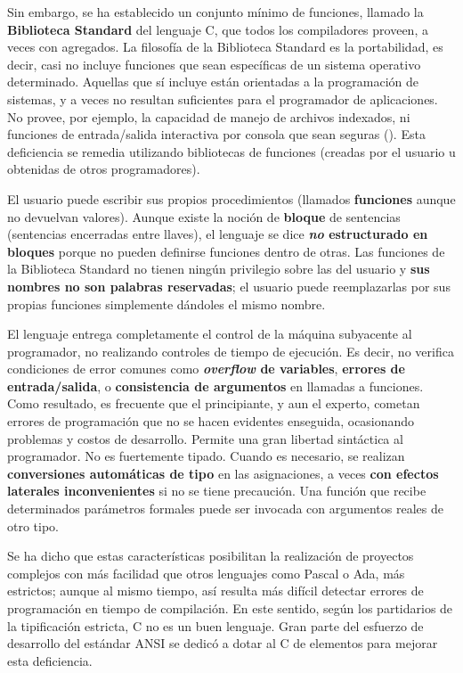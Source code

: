 Sin embargo, se ha establecido un conjunto mínimo de funciones,
llamado la \textbf{Biblioteca Standard} del lenguaje C, que todos los
compiladores proveen, a veces con agregados. La filosofía de la
Biblioteca Standard es la portabilidad, es decir, casi no incluye
funciones que sean específicas de un sistema operativo determinado.
Aquellas que sí incluye están orientadas a la programación de sistemas, y a
veces no resultan suficientes para el programador de aplicaciones. No
provee, por ejemplo, la capacidad de manejo de archivos indexados, ni
funciones de entrada/salida interactiva por consola que sean seguras
(). Esta deficiencia
se remedia utilizando bibliotecas de funciones  (creadas por el usuario u obtenidas de
otros programadores). 

El usuario puede escribir sus propios procedimientos (llamados
\textbf{funciones} aunque no devuelvan valores). Aunque existe la
noción de \textbf{bloque} de sentencias (sentencias encerradas entre llaves), el lenguaje se dice \textbf{\textit{no}
estructurado en bloques} porque no pueden definirse funciones dentro de
otras. Las funciones de la Biblioteca Standard no tienen ningún
privilegio sobre las del usuario y \textbf{sus nombres no son palabras
reservadas}; el usuario puede reemplazarlas por sus propias funciones
simplemente dándoles el mismo nombre. 

El lenguaje entrega completamente el control de la máquina subyacente
al programador, no realizando controles de tiempo de ejecución. Es
decir, no verifica condiciones de error comunes como \textbf{\textit{overflow}
de variables}, \textbf{errores de entrada/salida}, o \textbf{consistencia de argumentos}
en llamadas a funciones. Como resultado, es frecuente que el
principiante, y aun el experto, cometan errores de programación que
no se hacen evidentes enseguida, ocasionando problemas y costos de
desarrollo. Permite una gran libertad sintáctica al programador. No
es fuertemente tipado. Cuando es necesario, se realizan \textbf{conversiones
automáticas de tipo} en las asignaciones, a veces \textbf{con efectos
laterales inconvenientes} si no se tiene precaución. Una función que
recibe determinados parámetros formales puede ser invocada con
argumentos reales de otro tipo. 

Se ha dicho que estas características
 posibilitan la realización de
proyectos complejos con más facilidad que otros lenguajes como Pascal
o Ada, más estrictos; aunque al mismo tiempo, así resulta más
difícil detectar errores de programación en tiempo de
compilación. En este sentido, según los partidarios de la
tipificación estricta, C no es un buen lenguaje. Gran parte del
esfuerzo de desarrollo del estándar ANSI se dedicó a dotar al C de
elementos para mejorar esta deficiencia. 

